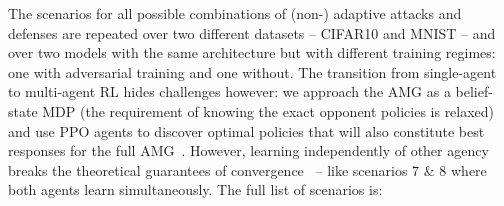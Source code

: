 The scenarios for all possible combinations of (non-) adaptive attacks and defenses are repeated over two different datasets -- CIFAR10 and MNIST -- and over two models with the same architecture but with different training regimes: one with adversarial training and one without.
The transition from single-agent to multi-agent \gls{RL} hides challenges however: we approach the AMG as a belief-state MDP (the requirement of knowing the exact opponent policies is relaxed) and use PPO \cite{schulman2017proximal} agents to discover optimal policies that will also constitute best responses for the full AMG~\cite{wen2019probabilistic}.
However, learning independently of other agency breaks the theoretical guarantees of convergence~\cite{tuyls2012multiagent} -- like scenarios 7 \& 8 where both agents learn simultaneously.
The full list of scenarios is:

